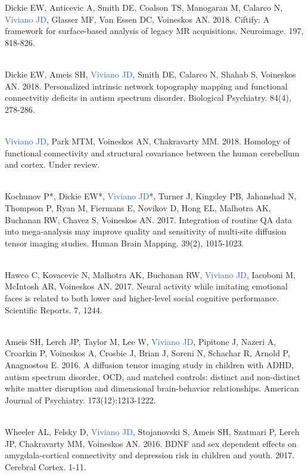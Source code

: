 \documentclass[a4paper,11pt,oneside]{book}
\begin{document}
\begin{flushleft}
Dickie EW, Anticevic A, Smith DE, Coalson TS, Manogaran M, Calarco N, \textcolor{highlight}{Viviano JD}, Glasser MF, Van Essen DC, Voineskos AN. 2018. Ciftify: A framework for surface-based analysis of legacy MR acquisitions. Neuroimage. 197, 818-826. \\\

Dickie EW, Ameis SH, \textcolor{highlight}{Viviano JD}, Smith DE, Calarco N, Shahab S, Voineskos AN. 2018. Personalized intrinsic network topography mapping and functional connectvitiy deficits in autism spectrum disorder. Biological Psychiatry. 84(4), 278-286. \\\

\textcolor{highlight}{Viviano JD}, Park MTM, Voineskos AN, Chakravarty MM. 2018. Homology of functional connectivity and structural covariance between the human cerebellum and cortex. Under review. \\\

Kochunov P*, Dickie EW*, \textcolor{highlight}{Viviano JD}*, Turner J, Kingsley PB, Jahanshad N, Thompson P, Ryan M, Fiermans E, Novikov D, Hong EL, Malhotra AK, Buchanan RW, Chavez S, Voineskos AN. 2017. Integration of routine QA data into mega-analysis may improve quality and sensitivity of multi-site diffusion tensor imaging studies. Human Brain Mapping. 39(2), 1015-1023. \\\

Hawco C, Kovacevic N, Malhotra AK, Buchanan RW, \textcolor{highlight}{Viviano JD}, Iacoboni M, McIntosh AR, Voineskos AN. 2017. Neural activity while imitating emotional faces is related to both lower and higher-level social cognitive performance. Scientific Reports. 7, 1244. \\\

Ameis SH, Lerch JP, Taylor M, Lee W, \textcolor{highlight}{Viviano JD}, Pipitone J, Nazeri A, Croarkin P, Voineskos A, Crosbie J, Brian J, Soreni N, Schachar R, Arnold P, Anagnostou E. 2016. A diffusion tensor imaging study in children with ADHD, autism spectrum disorder, OCD, and matched controls: distinct and non-distinct white matter disruption and dimensional brain-behavior relationships. American Journal of Psychiatry. 173(12):1213-1222. \\\

Wheeler AL, Felsky D, \textcolor{highlight}{Viviano JD}, Stojanovski S, Ameis SH, Szatmari P, Lerch JP, Chakravarty MM, Voineskos AN. 2016. BDNF and sex dependent effects on amygdala-cortical connectivity and depression risk in children and youth. 2017. Cerebral Cortex. 1-11. \\\


\end{flushleft}
\end{document}
